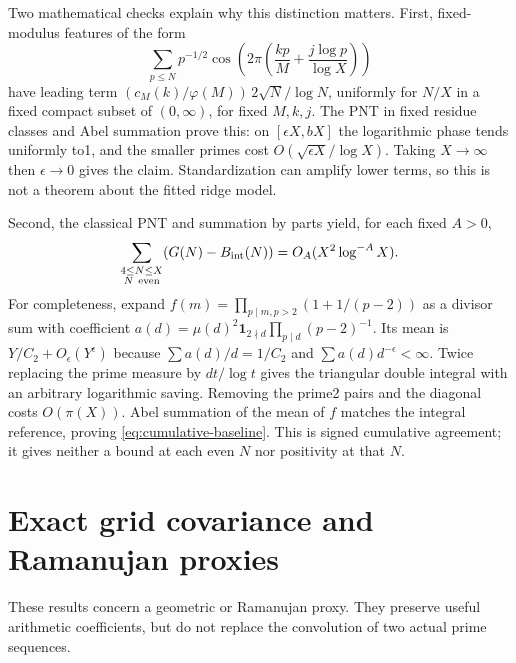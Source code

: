\documentclass[11pt,a4paper]{article}
\theoremstyle{definition}
\theoremstyle{remark}
\newcommand{\ind}{\mathbf1}
\begin{document}
Two mathematical checks explain why this distinction matters. First, fixed-modulus features of the form
\[\sum_{p\le N}p^{-1/2}\cos\left(2\pi\left(\frac{kp}{M}+\frac{j\log p}{\log X}\right)\right)\]
have leading term $(c_M(k)/\varphi(M))\,2\sqrt N/\log N$, uniformly for $N/X$ in a fixed compact subset of $(0,\infty)$, for fixed $M,k,j$. The PNT in fixed residue classes and Abel summation prove this: on $[\epsilon X,bX]$ the logarithmic phase tends uniformly to1, and the smaller primes cost $O(\sqrt{\epsilon X}/\log X)$. Taking $X\to\infty$ then $\epsilon\to0$ gives the claim. Standardization can amplify lower terms, so this is not a theorem about the fitted ridge model.

Second, the classical PNT and summation by parts yield, for each fixed $A>0$,
\begin{equation}\label{eq:cumulative-baseline}
 \sum_{\substack{4\le N\le X\\N\ {\rm even}}}(G(N)-B_{\rm int}(N))
 =O_A(X^2\log^{-A}X).
\end{equation}
For completeness, expand $f(m)=\prod_{p\mid m,p>2}(1+1/(p-2))$ as a divisor sum with coefficient $a(d)=\mu(d)^2\ind_{2\nmid d}\prod_{p\mid d}(p-2)^{-1}$. Its mean is $Y/C_2+O_\epsilon(Y^\epsilon)$ because $\sum a(d)/d=1/C_2$ and $\sum a(d)d^{-\epsilon}<\infty$. Twice replacing the prime measure by $dt/\log t$ gives the triangular double integral with an arbitrary logarithmic saving. Removing the prime2 pairs and the diagonal costs $O(\pi(X))$. Abel summation of the mean of $f$ matches the integral reference, proving \eqref{eq:cumulative-baseline}. This is signed cumulative agreement; it gives neither a bound at each even $N$ nor positivity at that $N$.


\section{Exact grid covariance and Ramanujan proxies}\label{sec:proxy}
These results concern a geometric or Ramanujan proxy. They preserve useful arithmetic coefficients, but do not replace the convolution of two actual prime sequences.
\end{document}

